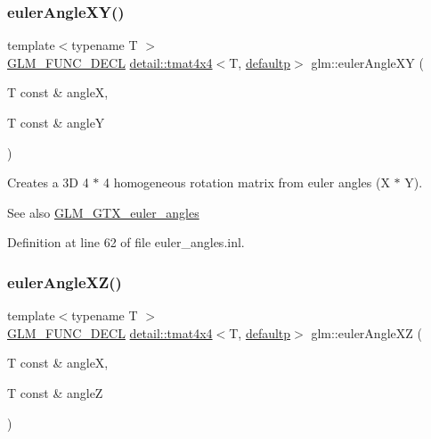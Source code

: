 \subsubsection{\texorpdfstring{euler\+Angle\+X\+Y()}{eulerAngleXY()}}
{\footnotesize\ttfamily template$<$typename T $>$ \\
\hyperlink{setup_8hpp_ab2d052de21a70539923e9bcbf6e83a51}{G\+L\+M\+\_\+\+F\+U\+N\+C\+\_\+\+D\+E\+CL} \hyperlink{structglm_1_1detail_1_1tmat4x4}{detail\+::tmat4x4}$<$T, \hyperlink{namespaceglm_a0f04f086094c747d227af4425893f545a9d21ccd8b5a009ec7eb7677befc3bf51}{defaultp}$>$ glm\+::euler\+Angle\+XY (\begin{DoxyParamCaption}\item[{T const \&}]{angleX,  }\item[{T const \&}]{angleY }\end{DoxyParamCaption})}

Creates a 3D 4 $\ast$ 4 homogeneous rotation matrix from euler angles (X $\ast$ Y). \begin{DoxySeeAlso}{See also}
\hyperlink{group__gtx__euler__angles}{G\+L\+M\+\_\+\+G\+T\+X\+\_\+euler\+\_\+angles} 
\end{DoxySeeAlso}


Definition at line 62 of file euler\+\_\+angles.\+inl.

\mbox{\label{group__gtx__euler__angles_ga61110cb520fbf21dd541cf4e25d81a65}} 
\subsubsection{\texorpdfstring{euler\+Angle\+X\+Z()}{eulerAngleXZ()}}
{\footnotesize\ttfamily template$<$typename T $>$ \\
\hyperlink{setup_8hpp_ab2d052de21a70539923e9bcbf6e83a51}{G\+L\+M\+\_\+\+F\+U\+N\+C\+\_\+\+D\+E\+CL} \hyperlink{structglm_1_1detail_1_1tmat4x4}{detail\+::tmat4x4}$<$T, \hyperlink{namespaceglm_a0f04f086094c747d227af4425893f545a9d21ccd8b5a009ec7eb7677befc3bf51}{defaultp}$>$ glm\+::euler\+Angle\+XZ (\begin{DoxyParamCaption}\item[{T const \&}]{angleX,  }\item[{T const \&}]{angleZ }\end{DoxyParamCaption})}


